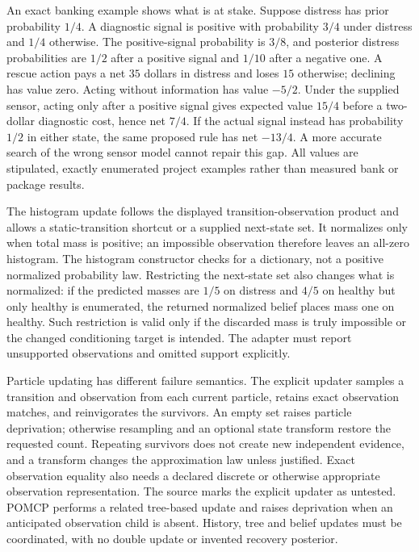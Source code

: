 An exact banking example shows what is at stake. Suppose distress has prior
probability $1/4$. A diagnostic signal is positive with probability $3/4$ under
distress and $1/4$ otherwise. The positive-signal probability is $3/8$, and
posterior distress probabilities are $1/2$ after a positive signal and $1/10$
after a negative one. A rescue action pays a net $35$ dollars in distress and
loses $15$ otherwise; declining has value zero. Acting without information has
value $-5/2$. Under the supplied sensor, acting only after a positive signal
gives expected value $15/4$ before a two-dollar diagnostic cost, hence net
$7/4$. If the actual signal instead has probability $1/2$ in either state,
the same proposed rule has net $-13/4$. A more accurate search of the wrong
sensor model cannot repair this gap. All values are stipulated, exactly
enumerated project examples rather than measured bank or package results.
\cite{exec23_pomdppy_reference}

The histogram update follows the displayed transition-observation product and
allows a static-transition shortcut or a supplied next-state set. It normalizes
only when total mass is positive; an impossible observation therefore leaves
an all-zero histogram. The histogram constructor checks for a dictionary, not
a positive normalized probability law. Restricting the next-state set also
changes what is normalized: if the predicted masses are $1/5$ on distress and
$4/5$ on healthy but only healthy is enumerated, the returned normalized belief
places mass one on healthy. Such restriction is valid only if the discarded
mass is truly impossible or the changed conditioning target is intended.
The adapter must report unsupported observations and omitted support explicitly.
\cite{exec23_pomdppy_sources,exec23_pomdppy_reference}

Particle updating has different failure semantics. The explicit updater samples
a transition and observation from each current particle, retains exact
observation matches, and reinvigorates the survivors. An empty set raises
particle deprivation; otherwise resampling and an optional state transform
restore the requested count. Repeating survivors does not create new
independent evidence, and a transform changes the approximation law unless
justified. Exact observation equality also needs a declared discrete or
otherwise appropriate observation representation. The source marks the explicit
updater as untested. POMCP performs a related tree-based update and raises
deprivation when an anticipated observation child is absent. History, tree and
belief updates must be coordinated, with no double update or invented recovery
posterior. \cite{exec23_pomdppy_sources}

